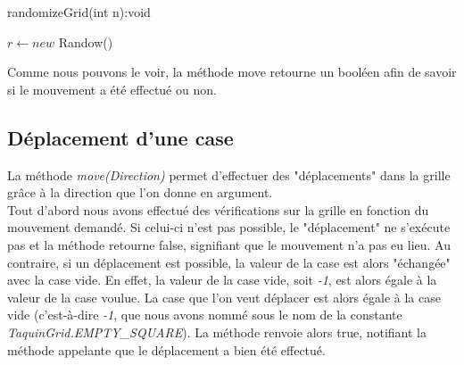 			\begin{algorithm}[H]
				\caption{randomizeGrid(int n):void}
				$r\leftarrow new$ Randow()

			\end{algorithm}

			Comme nous pouvons le voir, la méthode move retourne un booléen afin de savoir si le mouvement a été effectué ou non.

		\subsection{Déplacement d'une case}

			La méthode \textit{move(Direction)} permet d'effectuer des "déplacements" dans la grille grâce à la direction que l'on donne en argument.\\
			Tout d'abord nous avons effectué des vérifications sur la grille en fonction du mouvement demandé. Si celui-ci n'est pas possible, le "déplacement" ne s’exécute pas et la méthode retourne false, signifiant que le mouvement n'a pas eu lieu. Au contraire, si un déplacement est possible, la valeur de la case est alors "échangée" avec la case vide. En effet, la valeur de la case vide, soit \textit{-1}, est alors égale à la valeur de la case voulue. La case que l'on veut déplacer est alors égale à la case vide (c'est-à-dire \textit{-1}, que nous avons nommé sous le nom de la constante \textit{TaquinGrid.EMPTY\_SQUARE}). La méthode renvoie alors true, notifiant la méthode appelante que le déplacement a bien été effectué.

